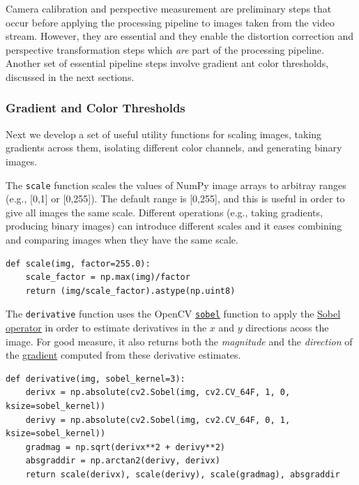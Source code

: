 \documentclass[11pt]{article}
\begin{document}
Camera calibration and perspective measurement are preliminary
steps that occur before applying the processing pipeline to
images taken from the video stream.  However, they are essential
and they enable the distortion correction and perspective
transformation steps which \emph{are} part of the processing
pipeline.  Another set of essential pipeline steps involve
gradient ant color thresholds, discussed in the next sections.  

\subsubsection*{Gradient and Color Thresholds}
\label{sec-2-2-4}

Next we develop a set of useful utility functions for scaling
images, taking gradients across them, isolating different color
channels, and generating binary images.

The \texttt{scale} function scales the values of NumPy image arrays to
arbitray ranges (e.g., [0,1] or [0,255]).  The default range is
[0,255], and this is useful in order to give all images the same
scale.  Different operations (e.g., taking gradients, producing
binary images) can introduce different scales and it eases
combining and comparing images when they have the same scale.

\begin{verbatim}
def scale(img, factor=255.0):
    scale_factor = np.max(img)/factor
    return (img/scale_factor).astype(np.uint8)
\end{verbatim}

The \texttt{derivative} function uses the OpenCV \href{http://docs.opencv.org/2.4/modules/imgproc/doc/filtering.html#sobel}{\texttt{sobel}} function to
apply the \href{https://en.wikipedia.org/wiki/Sobel_operator}{Sobel operator} in order to estimate derivatives in the
$x$ and $y$ directions acoss the image.  For good measure, it
also returns both the \emph{magnitude} and the \emph{direction} of the
\href{https://en.wikipedia.org/wiki/Gradient}{gradient} computed from these derivative estimates.  

\begin{verbatim}
def derivative(img, sobel_kernel=3):
    derivx = np.absolute(cv2.Sobel(img, cv2.CV_64F, 1, 0, ksize=sobel_kernel))
    derivy = np.absolute(cv2.Sobel(img, cv2.CV_64F, 0, 1, ksize=sobel_kernel))
    gradmag = np.sqrt(derivx**2 + derivy**2)
    absgraddir = np.arctan2(derivy, derivx)
    return scale(derivx), scale(derivy), scale(gradmag), absgraddir
\end{verbatim}
\end{document}
